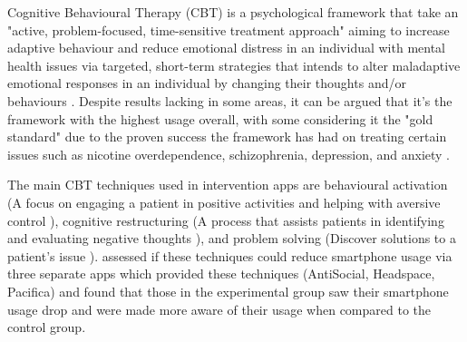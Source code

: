 \documentclass[12pt]{article}
\begin{document}
Cognitive Behavioural Therapy (CBT) is a psychological framework that take an "active, problem-focused, 
time-sensitive treatment approach" aiming to increase adaptive 
behaviour and reduce emotional distress in an individual with mental health issues via targeted, short-term 
strategies that intends to alter maladaptive emotional responses in an individual by changing their thoughts and/or 
behaviours \autocite{RefWorks:RefID:138-wenzel2017basic,RefWorks:RefID:139-kaczkurkin2015cognitivebehavioral}.
Despite results lacking in some areas, it can be argued that it's the framework with the highest usage 
\autocite{RefWorks:RefID:140-hofmann2012efficacy} overall, with some considering it the "gold 
standard" \autocite{RefWorks:RefID:141-beck2020cognitive} due to the proven success the framework has had on 
treating certain issues such as nicotine overdependence, schizophrenia, 
depression, and anxiety \autocite{RefWorks:RefID:140-hofmann2012efficacy}. \newline


The main CBT techniques used in intervention apps are behavioural activation (A focus on engaging
a patient in positive activities and helping with aversive control 
\autocite{RefWorks:RefID:146-tindall2017behavioural}), cognitive restructuring (A process that assists patients 
in identifying and evaluating negative thoughts \autocite{RefWorks:RefID:138-wenzel2017basic}), and problem solving 
(Discover solutions to a patient's issue \autocite{RefWorks:RefID:144-denecke2022implementation}). 
\textcite{RefWorks:RefID:147-throuvala2020mind} assessed if these techniques could reduce smartphone 
usage via three separate apps which provided these techniques (AntiSocial, Headspace, Pacifica) and found that 
those in the experimental group saw their smartphone usage drop and were made more aware of their usage when 
compared to the control group.
\end{document}
